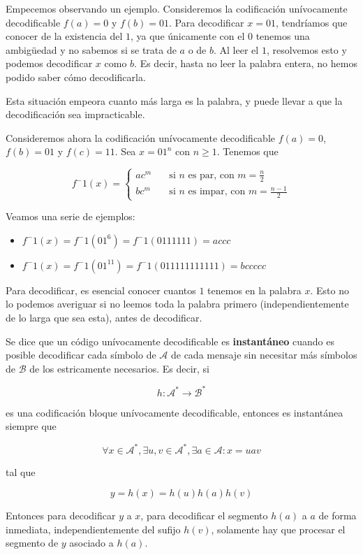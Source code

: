 Empecemos observando un ejemplo. Consideremos la codificación
unívocamente decodificable \(f(a)=0\) y \(f(b)=01\). Para decodificar
\(x=01\), tendríamos que conocer de la existencia del \(1\), ya que
únicamente con el \(0\) tenemos una ambigüedad y no sabemos si se trata
de \(a\) o de \(b\). Al leer el \(1\), resolvemos esto y podemos
decodificar \(x\) como \(b\). Es decir, hasta no leer la palabra entera,
no hemos podido saber cómo decodificarla.

Esta situación empeora cuanto más larga es la palabra, y puede llevar a
que la decodificación sea impracticable.

Consideremos ahora la codificación unívocamente decodificable
\(f(a)=0\), \(f(b)=01\) y \(f(c)=11\). Sea \(x=01^n\) con \(n\geq 1\).
Tenemos que

\[
f^-1(x) = \begin{cases}
ac^m&\quad\text{si }n\text{ es par, con }m=\frac{n}{2}\\
bc^m&\quad\text{si }n\text{ es impar, con }m=\frac{n-1}{2}
\end{cases}
\]

Veamos una serie de ejemplos:

\begin{itemize}
\tightlist
\item
  \(f^-1(x)=f^-1(01^6)=f^-1(0111111)=accc\)
\item
  \(f^-1(x)=f^-1(01^{11})=f^-1(011111111111)=bccccc\)
\end{itemize}

Para decodificar, es esencial conocer cuantos \(1\) tenemos en la
palabra \(x\). Esto no lo podemos averiguar si no leemos toda la palabra
primero (independientemente de lo larga que sea esta), antes de
decodificar.

Se dice que un código unívocamente decodificable es \textbf{instantáneo}
cuando es posible decodificar cada símbolo de \(\mathcal{A}\) de cada
mensaje sin necesitar más símbolos de \(\mathcal{B}\) de los
estricamente necesarios. Es decir, si

\[
h:\mathcal{A}^*\rightarrow\mathcal{B}^*
\]

es una codificación bloque unívocamente decodificable, entonces es
instantánea siempre que

\[
\forall x\in\mathcal{A}^*, \exists u,v\in\mathcal{A}^*,\exists a\in\mathcal{A}: x=uav
\]

tal que

\[
y=h(x)=h(u)h(a)h(v)
\]

Entonces para decodificar \(y\) a \(x\), para decodificar el segmento
\(h(a)\) a \(a\) de forma inmediata, independientemente del sufijo
\(h(v)\), solamente hay que procesar el segmento de \(y\) asociado a
\(h(a)\).
